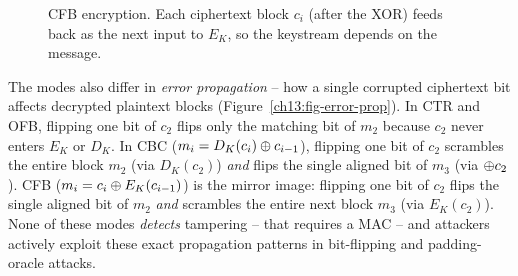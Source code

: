 \begin{figure}[htbp]
\centering
{}
\caption{CFB encryption. Each ciphertext block $c_i$ (after the XOR) feeds back as the next input to $E_K$, so the keystream depends on the message.}
\label{ch13:cfb-diagram}
\end{figure}

\begin{remark}
The modes also differ in \emph{error propagation} -- how a single corrupted ciphertext bit affects decrypted plaintext blocks (Figure~\ref{ch13:fig-error-prop}). In CTR and OFB, flipping one bit of $c_2$ flips only the matching bit of $m_2$ because $c_2$ never enters $E_K$ or $D_K$. In CBC ($m_i = D_K(c_i) \oplus c_{i-1}$), flipping one bit of $c_2$ scrambles the entire block $m_2$ (via $D_K(c_2)$) \emph{and} flips the single aligned bit of $m_3$ (via $\oplus c_2$). CFB ($m_i = c_i \oplus E_K(c_{i-1})$) is the mirror image: flipping one bit of $c_2$ flips the single aligned bit of $m_2$ \emph{and} scrambles the entire next block $m_3$ (via $E_K(c_2)$). None of these modes \emph{detects} tampering -- that requires a MAC -- and attackers actively exploit these exact propagation patterns in bit-flipping and padding-oracle attacks.
\end{remark}

